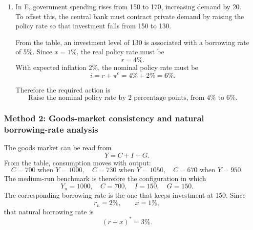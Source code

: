 \documentclass[12pt]{article}
\begin{document}
\begin{enumerate}[label=(\alph*)]
    So the required action is
    \[
    \boxed{\text{Lower the nominal policy rate by 2 percentage points, from }4\%\text{ to }2\%.}
    \]

    \item
    In E, government spending rises from 150 to 170, increasing demand by 20. To offset this, the central bank must contract private demand by raising the policy rate so that investment falls from 150 to 130.

    From the table, an investment level of 130 is associated with a borrowing rate of 5\%. Since \(x=1\%\), the real policy rate must be
    \[
    r=4\%.
    \]
    With expected inflation 2\%, the nominal policy rate must be
    \[
    i=r+\pi^e=4\%+2\%=6\%.
    \]

    Therefore the required action is
    \[
    \boxed{\text{Raise the nominal policy rate by 2 percentage points, from }4\%\text{ to }6\%.}
    \]
\end{enumerate}

\subsubsection{Method 2: Goods-market consistency and natural borrowing-rate analysis}
The goods market can be read from
\[
Y=C+I+G.
\]
From the table, consumption moves with output:
\[
C=700 \text{ when } Y=1000,
\quad
C=730 \text{ when } Y=1050,
\quad
C=670 \text{ when } Y=950.
\]
The medium-run benchmark is therefore the configuration in which
\[
Y_n=1000,
\quad
C=700,
\quad
I=150,
\quad
G=150.
\]
The corresponding borrowing rate is the one that keeps investment at 150. Since
\[
r_n=2\%,\qquad x=1\%,
\]
that natural borrowing rate is
\[
(r+x)^*=3\%.
\]
\end{document}
